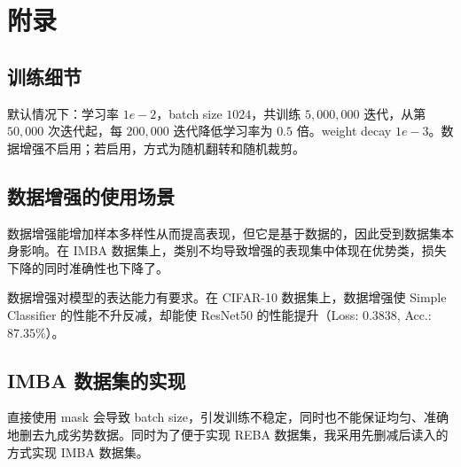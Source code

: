 \documentclass[a4paper]{article}
\begin{document}
\section{附录}
\subsection{训练细节}
默认情况下：学习率 $1e-2$，batch size $1024$，共训练 $5,000,000$ 迭代，从第 $50,000$ 次迭代起，每 $200,000$ 迭代降低学习率为 $0.5$ 倍。weight decay $1e-3$。数据增强不启用；若启用，方式为随机翻转和随机裁剪。

\subsection{数据增强的使用场景}
数据增强能增加样本多样性从而提高表现，但它是基于数据的，因此受到数据集本身影响。在 IMBA 数据集上，类别不均导致增强的表现集中体现在优势类，损失下降的同时准确性也下降了。

数据增强对模型的表达能力有要求。在 CIFAR-10 数据集上，数据增强使 Simple Classifier 的性能不升反减，却能使 ResNet50 的性能提升（Loss: $0.3838$, Acc.: $87.35\%$）。

\subsection{IMBA 数据集的实现}
直接使用 mask 会导致 batch size，引发训练不稳定，同时也不能保证均匀、准确地删去九成劣势数据。同时为了便于实现 REBA 数据集，我采用先删减后读入的方式实现 IMBA 数据集。
\end{document}
